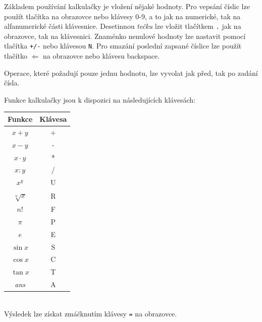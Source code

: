 \documentclass[a4paper]{article}
\begin{document}
Základem používání kalkulačky je vložení nějaké hodnoty. Pro vepsání číslic lze použít tlačítka na obrazovce nebo klávesy 0-9, a to jak na numerické, tak na alfanumerické části klávesnice. 
Desetinnou \textit{tečku} lze vložit tlačítkem \verb|.| jak na obrazovce, tak na klávesnici.
Znaménko nenulové hodnoty lze nastavit pomocí tlačítka \verb|+/-| nebo klávesou \verb|N|.
Pro smazání poslední zapsané číslice lze použít tlačítko $\Leftarrow$ na obrazovce nebo klávesu backspace.

Operace, které požadují pouze jednu hodnotu, lze vyvolat jak před, tak po zadání čísla.

Funkce kalkulačky jsou k dispozici na následujících klávesách:

\begin{tabular}{|c|c|}
\hline
Funkce & Klávesa \\
\hline
$x + y$ & + \\
$x - y$ & - \\
$x \cdot y$ & * \\
$x : y$ & / \\
$x^y$  & U \\
$\sqrt[n]{x}$ & R \\
$n!$ & F \\
$\pi$ & P \\
$e$ & E \\
$\sin{x}$ & S \\
$\cos{x}$ & C \\
$\tan{x}$ & T \\
\textit{ans} & A \\
\hline
\end{tabular}\\

Výsledek lze získat zmáčknutím klávesy \verb|=| na obrazovce.
\end{document}
